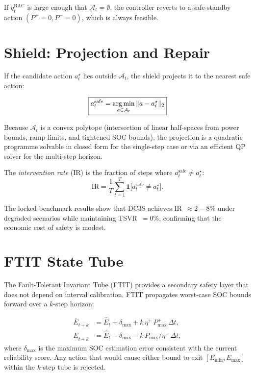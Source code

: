 If $q_t^{\mathrm{RAC}}$ is large enough that $\mathcal{A}_t = \emptyset$,
the controller reverts to a safe-standby action
$(P^{+} = 0, P^{-} = 0)$, which is always feasible.

\section{Shield: Projection and Repair}
\label{sec:shield}

If the candidate action $a_t^\star$ lies outside $\mathcal{A}_t$, the shield
projects it to the nearest safe action:

\begin{equation}
\label{eq:repair}
\boxed{
  a_t^{\mathrm{safe}} = \operatorname*{arg\,min}_{a \in \mathcal{A}_t}
    \|a - a_t^\star\|_2
}
\end{equation}

Because $\mathcal{A}_t$ is a convex polytope (intersection of linear
half-spaces from power bounds, ramp limits, and tightened SOC bounds), the
projection is a quadratic programme solvable in closed form for the
single-step case or via an efficient QP solver for the multi-step horizon.

The \emph{intervention rate} (IR) is the fraction of steps where
$a_t^{\mathrm{safe}} \neq a_t^\star$:
\[
  \mathrm{IR} = \frac{1}{T} \sum_{t=1}^{T}
    \mathbf{1}\!\bigl[a_t^{\mathrm{safe}} \neq a_t^\star\bigr].
\]

The locked benchmark results show that DC3S achieves IR~$\approx 2{-}8\%$
under degraded scenarios while maintaining TSVR~$= 0\%$, confirming that the
economic cost of safety is modest.

\section{FTIT State Tube}
\label{sec:ftit}

The Fault-Tolerant Invariant Tube (FTIT) provides a secondary safety layer
that does not depend on interval calibration.  FTIT propagates worst-case
SOC bounds forward over a $k$-step horizon:

\begin{equation}
\label{eq:ftit}
\begin{aligned}
  \overline{E}_{t+k} &= \hat{E}_t + \delta_{\max}
    + k\,\eta^{+}\,P_{\max}^{+}\,\Delta t, \\
  \underline{E}_{t+k} &= \hat{E}_t - \delta_{\max}
    - k\,P_{\max}^{-}/\eta^{-}\,\Delta t,
\end{aligned}
\end{equation}
where $\delta_{\max}$ is the maximum SOC estimation error consistent with
the current reliability score.  Any action that would cause either bound to
exit $[E_{\min}, E_{\max}]$ within the $k$-step tube is rejected.

